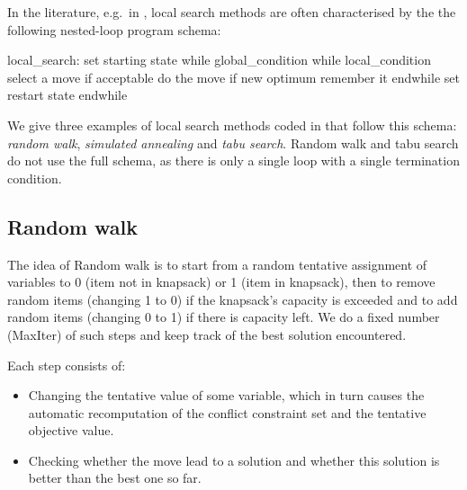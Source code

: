 In the literature, e.g.\ in \cite{Localizer},
local search methods are often characterised by
the the following nested-loop program schema:
{\samepage
\begin{code}
local_search:
     set starting state
     while global_condition
         while local_condition
             select a move
             if acceptable
                 do the move
                 if new optimum
                     remember it
         endwhile
         set restart state
     endwhile
\end{code}
}
We give three examples of local search methods coded in {\eclipse} that
follow this schema: {\em random walk}, {\em simulated annealing} and
{\em tabu search}.
Random walk and tabu search do not use the full schema, as there is
only a single loop with a single termination condition.


\subsection{Random walk}

The idea of Random walk is to start from a random tentative assignment of
variables to 0 (item not in knapsack) or 1 (item in knapsack), then to
remove random items (changing 1 to 0) if the knapsack's capacity is
exceeded and to add random items (changing 0 to 1) if there is
capacity left.  We do a fixed number (MaxIter) of such steps and keep
track of the best solution encountered.

Each step consists of:
\begin{itemize}
\item Changing the tentative value of some variable, which in turn causes
        the automatic recomputation of the conflict constraint set
        and the tentative objective value.
\item Checking whether the move lead to a solution and whether this
        solution is better than the best one so far.
\end{itemize}

